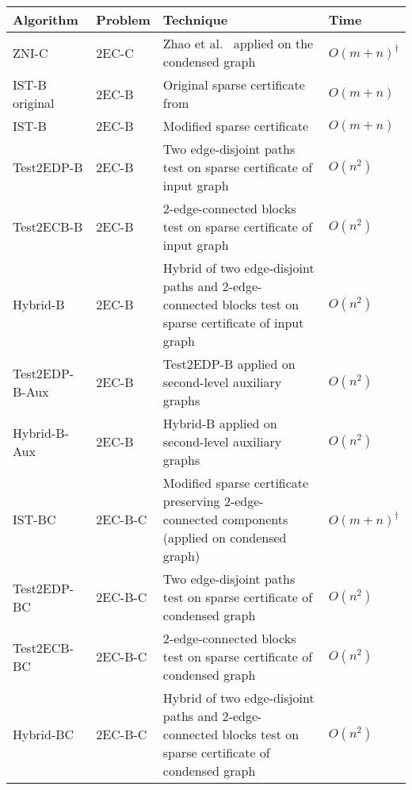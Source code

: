 \documentclass[11pt]{article}
\begin{document}
\begin{table}[!ht]
\begin{adjustbox}{width=\textwidth,totalheight=\textheight,keepaspectratio}
\begin{small}
\tabulinesep=1.0mm
\setlength{\tabcolsep}{4.0pt} \begin{tabu}[t]{p{2.78cm}p{1.32cm}p{8.2cm}p{1.50cm}} \hline
  Algorithm & Problem & Technique & Time \\
 \hline
 \textsf{ZNI-C}  & \textsf{2EC-C}  & Zhao et al.~\cite{ZNI:MSCS:2003} applied on the  condensed graph  & $O(m+n)^{\dag}$  \\
 \hline
  \textsf{IST-B original}  & \textsf{2EC-B}  & Original sparse certificate from \cite{2ECB}  & $O(m+n)$  \\
  \textsf{IST-B}                   & \textsf{2EC-B} &  Modified sparse certificate & $O(m+n)$  \\
  \textsf{Test2EDP-B}             & \textsf{2EC-B} & Two edge-disjoint paths test on sparse certificate of input graph & $O(n^2)$ \\
  \textsf{Test2ECB-B}             & \textsf{2EC-B} & $2$-edge-connected blocks test on sparse certificate of input graph & $O(n^2)$ \\
  \textsf{Hybrid-B}                   & \textsf{2EC-B} & Hybrid of two edge-disjoint paths and $2$-edge-connected blocks test on sparse certificate of input graph & $O(n^2)$ \\
   \textsf{Test2EDP-B-Aux}             & \textsf{2EC-B} & \textsf{Test2EDP-B} applied on second-level auxiliary graphs & $O(n^2)$ \\
   \textsf{Hybrid-B-Aux}                   & \textsf{2EC-B} & \textsf{Hybrid-B} applied on second-level auxiliary graphs & $O(n^2)$ \\
  \hline
  \textsf{IST-BC}                   & \textsf{2EC-B-C} &  Modified sparse certificate preserving $2$-edge-connected components (applied on condensed graph) & $O(m+n)^{\dag}$  \\
  \textsf{Test2EDP-BC}             & \textsf{2EC-B-C} & Two edge-disjoint paths test on sparse certificate of condensed graph & $O(n^2)$ \\
   \textsf{Test2ECB-BC}             & \textsf{2EC-B-C} & $2$-edge-connected blocks test on sparse certificate of condensed graph & $O(n^2)$ \\
  \textsf{Hybrid-BC}                   & \textsf{2EC-B-C} & Hybrid of two edge-disjoint paths and $2$-edge-connected blocks test on sparse certificate of condensed graph & $O(n^2)$ \\

\end{tabu}
\end{small}
\end{adjustbox}
\end{table}
\end{document}
